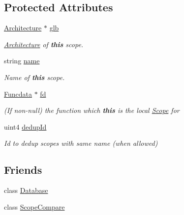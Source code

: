 \subsection*{Protected Attributes}
\begin{DoxyCompactItemize}
\item 
\mbox{\hyperlink{class_architecture}{Architecture}} $\ast$ \mbox{\hyperlink{class_scope_aa5939cb5690f2f2b4f52a88ae561622d}{glb}}
\begin{DoxyCompactList}\small\item\em \mbox{\hyperlink{class_architecture}{Architecture}} of {\bfseries{this}} scope. \end{DoxyCompactList}\item 
string \mbox{\hyperlink{class_scope_abb4900f6409e8a82c1b1cea827e4e2c5}{name}}
\begin{DoxyCompactList}\small\item\em Name of {\bfseries{this}} scope. \end{DoxyCompactList}\item 
\mbox{\hyperlink{class_funcdata}{Funcdata}} $\ast$ \mbox{\hyperlink{class_scope_a72f6c31e73c46216482a6902d22b3330}{fd}}
\begin{DoxyCompactList}\small\item\em (If non-\/null) the function which {\bfseries{this}} is the local \mbox{\hyperlink{class_scope}{Scope}} for \end{DoxyCompactList}\item 
uint4 \mbox{\hyperlink{class_scope_a595958fb57d57650588b8400290b74a6}{dedup\+Id}}
\begin{DoxyCompactList}\small\item\em Id to dedup scopes with same name (when allowed) \end{DoxyCompactList}\end{DoxyCompactItemize}
\subsection*{Friends}
\begin{DoxyCompactItemize}
\item 
class \mbox{\hyperlink{class_scope_a6efef52d7a939622bbc934ff6b90ffe0}{Database}}
\item 
class \mbox{\hyperlink{class_scope_a7ec804b298dc727f18acb363664fb4f5}{Scope\+Compare}}
\end{DoxyCompactItemize}


